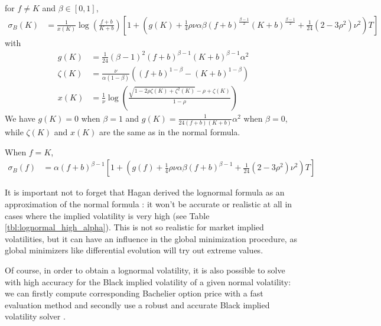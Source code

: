 \documentclass[]{rAMF2e}
\begin{document}
for $f \neq K$ and $\beta \in [0,1]$,
\begin{align}
\sigma_B(K) &= \frac{1}{x(K)}\log(\frac{f+b}{K+b})\left[1+\left(g(K)+\frac{1}{4}\rho\nu\alpha\beta(f+b)^{\frac{\beta-1}{2}}(K+b)^{\frac{\beta-1}{2}}+\frac{1}{24}(2-3\rho^2)\nu^2\right)T\right]
\end{align}
with 
\begin{align*}
g(K) &= \frac{1}{24} (\beta-1)^2 (f+b)^{\beta-1} (K+b)^{\beta-1} \alpha^2\\
\zeta(K) &= \frac{\nu}{\alpha (1-\beta)} \left( (f+b)^{1-\beta} - (K+b)^{1-\beta} \right)\\
x(K) &= \frac{1}{\nu}\log\left(\frac{\sqrt{1-2\rho\zeta(K)+\zeta^2(K)}-\rho+\zeta(K)}{1-\rho} \right)
\end{align*}
We have $g(K) = 0$ when $\beta = 1$ and $g(K) = \frac{1}{24(f+b)(K+b)}\alpha^2$ when $\beta = 0$, while $\zeta(K)$ and $x(K)$ are the same as in the normal formula.

When $f=K$, 
\begin{align}
\sigma_B(f) &= \alpha (f+b)^{\beta-1} \left[1+\left(g(f)+\frac{1}{4}\rho\nu\alpha\beta(f+b)^{\beta-1}+\frac{1}{24}(2-3\rho^2)\nu^2\right)T\right]
\end{align}


%
It is important not to forget that Hagan derived the lognormal formula as an approximation of the normal formula \citep{hagan2002managing}: it won't be accurate or realistic at all in cases where the implied volatility is very high (see Table \ref{tbl:lognormal_high_alpha}). This is not so realistic for market implied volatilities, but it can have an influence in the global minimization procedure, as global minimizers like differential evolution will try out extreme values.

Of course, in order to obtain a lognormal volatility, it is also possible to solve with high accuracy for the Black implied volatility of a given normal volatility: we can firstly compute corresponding Bachelier option price with a fast evaluation method \citep{lefloch2014bpvol} and secondly use a robust and accurate Black implied volatility solver \citep{jackel2013let, li2011adaptive}.
\end{document}
